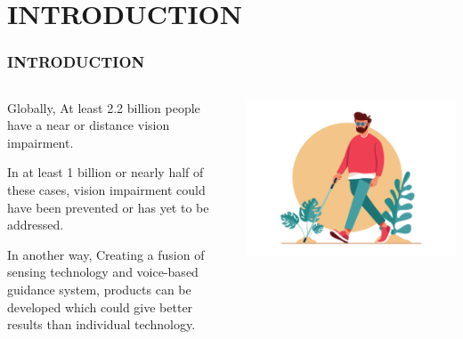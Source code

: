 \documentclass[
	11pt, %
	t, %
	aspectratio=169, %
]{beamer}
\begin{document}
\section{INTRODUCTION}
\begin{frame}
	\frametitle{INTRODUCTION}

	\begin{columns}[c] %
		\begin{column}{0.45\textwidth} %

 Globally, At least \alert{2.2 billion people} have a near or distance vision impairment.

\bigskip

In at least 1 billion or nearly half of these cases, vision impairment could have been prevented or has yet to be addressed.

\bigskip

In another way, Creating a fusion of sensing technology and voice-based guidance system, products can be developed which could give better results than individual technology.

		\end{column}
		
		\begin{column}{0.45\textwidth} %
			\includegraphics[width=\textwidth]{./blind.jpg}
		\end{column}
	\end{columns}

\end{frame}
\end{document}
